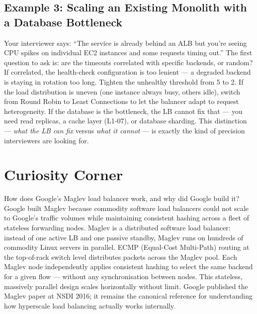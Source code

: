 \documentclass[11pt,a4paper]{article}
\begin{document}
\subsection{Example 3: Scaling an Existing Monolith with a Database Bottleneck}

Your interviewer says: ``The service is already behind an ALB but you're seeing CPU spikes on
individual EC2 instances and some requests timing out.'' The first question to ask is: are the
timeouts correlated with specific backends, or random? If correlated, the health-check configuration
is too lenient --- a degraded backend is staying in rotation too long. Tighten the unhealthy
threshold from 5 to 2. If the load distribution is uneven (one instance always busy, others idle),
switch from Round Robin to Least Connections to let the balancer adapt to request heterogeneity.
If the database is the bottleneck, the LB cannot fix that --- you need read replicas, a cache layer
(L1-07), or database sharding. This distinction --- \emph{what the LB can fix} versus \emph{what
it cannot} --- is exactly the kind of precision interviewers are looking for.

\section{Curiosity Corner}

\begin{curiobox}{How does Google's Maglev load balancer work, and why did Google build it?}
  Google built Maglev because commodity software load balancers could not scale to Google's traffic
  volumes while maintaining consistent hashing across a fleet of stateless forwarding nodes.
  Maglev is a distributed software load balancer: instead of one active LB and one passive standby,
  Maglev runs on hundreds of commodity Linux servers in parallel. ECMP (Equal-Cost Multi-Path)
  routing at the top-of-rack switch level distributes packets across the Maglev pool. Each Maglev
  node independently applies consistent hashing to select the same backend for a given flow ---
  without any synchronisation between nodes. This stateless, massively parallel design scales
  horizontally without limit. Google published the Maglev paper at NSDI 2016; it remains the
  canonical reference for understanding how hyperscale load balancing actually works internally.
\end{curiobox}
\end{document}

